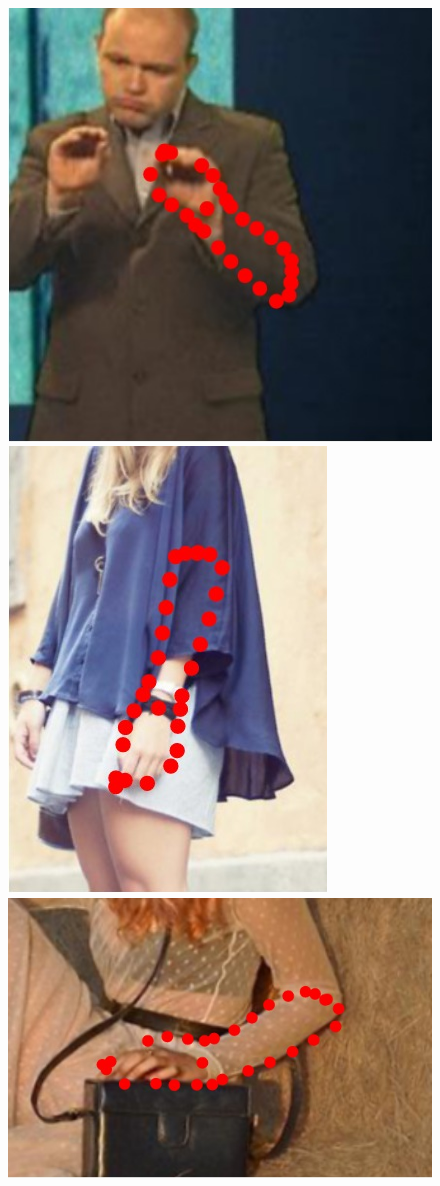 \begin{figure}
    \hfill
    \includegraphics[height=\ofh]{resources/Annotation_Correction/Suplementory_Meterial/ExFit/0020}
    \hfill
    \includegraphics[height=\ofh]{resources/Annotation_Correction/Suplementory_Meterial/ExFit/0021}
    \hfill
    \includegraphics[height=\ofh]{resources/Annotation_Correction/Suplementory_Meterial/ExFit/0022}

\end{figure}
